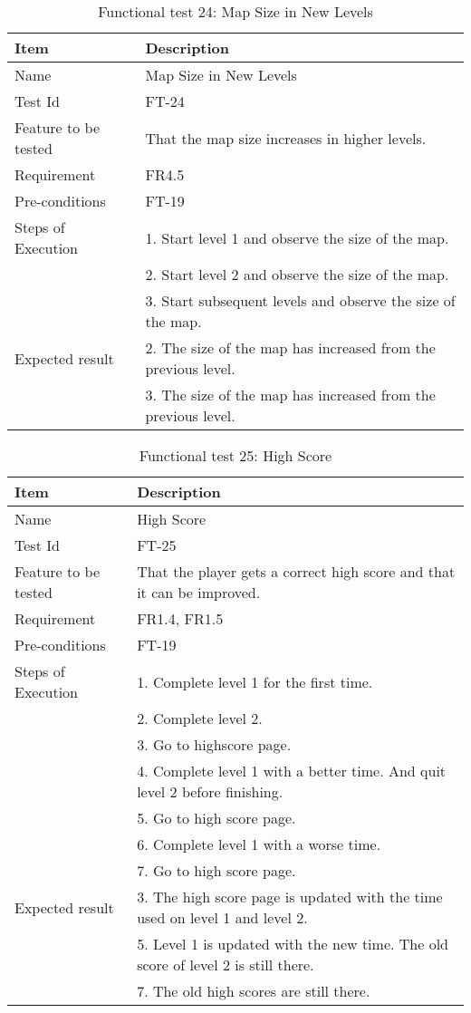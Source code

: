 \begin{table}[H]
\centering
	\begin{tabular}{ l | p{8cm} }
		\hline
		\rowcolor{lightgray}
		{\bf Item} & {\bf Description} \\ \hline
		Name & Map Size in New Levels \\ 
		Test Id & FT-24 \\ 
		Feature to be tested & That the map size increases in higher levels. \\ 
		Requirement & FR4.5 \\ 
		Pre-conditions & FT-19 \\ 
		Steps of Execution & 1. Start level 1 and observe the size of the map. \\
		& 2. Start level 2 and observe the size of the map. \\
		& 3. Start subsequent levels and observe the size of the map. \\
		Expected result & 2. The size of the map has increased from the previous level. \\
		& 3. The size of the map has increased from the previous level. \\
		\hline
	\end{tabular}
	\caption{Functional test 24: Map Size in New Levels}
\end{table}

\begin{table}[H]
\centering
	\begin{tabular}{ l | p{8cm} }
		\hline
		\rowcolor{lightgray}
		{\bf Item} & {\bf Description} \\ \hline
		Name & High Score \\ 
		Test Id & FT-25 \\ 
		Feature to be tested & That the player gets a correct high score and that it can be improved. \\ 
		Requirement & FR1.4, FR1.5 \\ 
		Pre-conditions & FT-19 \\ 
		Steps of Execution & 1. Complete level 1 for the first time. \\
		& 2. Complete level 2. \\
		& 3. Go to highscore page. \\
		& 4. Complete level 1 with a better time. And quit level 2 before finishing. \\
		& 5. Go to high score page. \\
		& 6. Complete level 1 with a worse time. \\
		& 7. Go to high score page. \\
		Expected result & 3. The high score page is updated with the time used on level 1 and level 2. \\
		& 5. Level 1 is updated with the new time. The old score of level 2 is still there. \\
		& 7. The old high scores are still there. \\
		\hline
	\end{tabular}
	\caption{Functional test 25: High Score}
\end{table}

